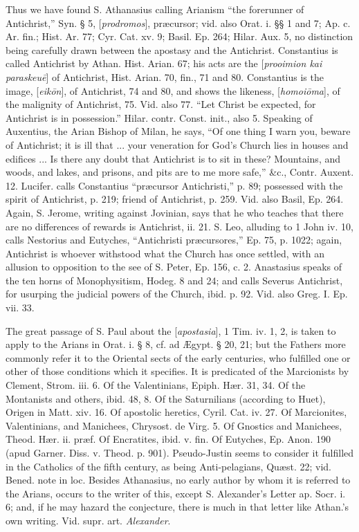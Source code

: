Thus we have found S. Athanasius calling Arianism
``the forerunner of Antichrist,'' Syn. § 5, [\emph{prodromos}], præcursor;
vid. also Orat. i. §§ 1 and 7; Ap. c. Ar. fin.; Hist. Ar. 77; Cyr.
Cat. xv. 9; Basil. Ep. 264; Hilar. Aux. 5, no distinction being
carefully drawn between the apostasy and the Antichrist. Constantius
is called Antichrist by Athan. Hist. Arian. 67; his acts are the [\emph{prooimion
kai paraskeu\={e}}] of Antichrist, Hist. Arian. 70, fin.,
71 and 80. Constantius is the image, [\emph{eik\={o}n}], of
Antichrist, 74 and 80, and shows the likeness, [\emph{homoi\={o}ma}],
of the malignity of Antichrist, 75. Vid. also 77. ``Let Christ be
expected, for Antichrist is in possession.'' Hilar. contr. Const.
init., also 5. Speaking of Auxentius, the Arian Bishop of Milan, he
says, ``Of one thing I warn you, beware of Antichrist; it is ill that
... your veneration for God's Church lies in houses and edifices ...
Is there any doubt that Antichrist is to sit in these? Mountains, and
woods, and lakes, and prisons, and pits are to me more safe,'' \&c.,
Contr. Auxent. 12. Lucifer. calls Constantius ``præcursor Antichristi,''
p. 89; possessed with the spirit of Antichrist, p. 219; friend of
Antichrist, p. 259. Vid. also Basil, Ep. 264. Again, S. Jerome,
writing against Jovinian, says that he who teaches that there are no
differences of rewards is Antichrist, ii. 21. S. Leo, alluding to 1
John iv. 10, calls Nestorius and Eutyches, ``Antichristi præcursores,''
Ep. 75, p. 1022; again, Antichrist is whoever withstood what the
Church has once settled, with an allusion to opposition to the see of
S. Peter, Ep. 156, c. 2. Anastasius speaks of the ten horns of
Monophysitism, Hodeg. 8 and 24; and calls Severus Antichrist, for
usurping the judicial powers of the Church, ibid. p. 92. Vid. also
Greg. I. Ep. vii. 33.

The great passage of S. Paul about the [\emph{apostasia}],
1 Tim. iv. 1, 2, is taken to apply to the Arians in Orat. i. § 8, cf.
ad Ægypt. § 20, 21; but the Fathers more commonly refer it to the
Oriental sects of the early centuries, who fulfilled one or other of
those conditions which it specifies. It is predicated of the
Marcionists by Clement, Strom. iii. 6. Of the Valentinians, Epiph. Hær.
31, 34. Of the Montanists and others, ibid. 48, 8. Of the Saturnilians
(according to Huet), Origen in Matt. xiv. 16. Of apostolic heretics,
Cyril. Cat. iv. 27. Of Marcionites, Valentinians, and Manichees,
Chrysost. de Virg. 5. Of Gnostics and Manichees, Theod. Hær. ii. præf.
Of Encratites, ibid. v. fin. Of Eutyches, Ep. Anon. 190 (apud Garner.
Diss. v. Theod. p. 901). Pseudo-Justin seems to consider it fulfilled
in the Catholics of the fifth century, as being Anti-pelagians, Quæst.
22; vid. Bened. note in loc. Besides Athanasius, no early author by
whom it is referred to the Arians, occurs to the writer of this,
except S. Alexander's Letter ap. Socr. i. 6; and, if he may hazard the
conjecture, there is much in that letter like Athan.'s own writing.
Vid. supr. art. \emph{Alexander}.

